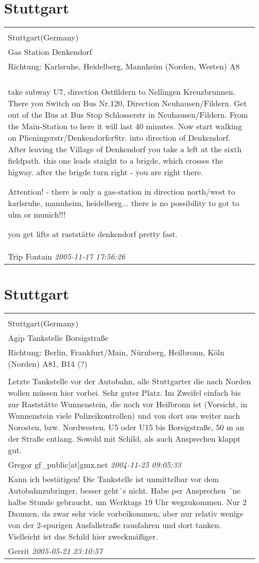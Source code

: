 \documentclass[a4paper,12pt]{article}
\begin{document}
\section{Stuttgart}
\begin{tabular}{|p{13cm}|}
\hline\\
Stuttgart(Germany)\\
Gas Station Denkendorf\\
Richtung: Karlsruhe, Heidelberg, Mannheim (Norden, Westen) A8 \\
\hline\\
take subway U7, direction Ostfildern to Nellingen Kreuzbrunnen. There you Switch on Bus Nr.120, Direction Neuhausen/Fildern. Get out of the Bus at Bus Stop Schlosserstr in Neuhausen/Fildern. From the Main-Station to here it will last 40 minutes. Now start walking on Plieningerstr/DenkendorferStr. into direction of Denkendorf. After leaving the Village of Denkendorf you take a left at the sixth fieldpath. this one leads staight to a brigde, which crosses the higway. after the brigde turn right - you are right there.

Attention! - there is only a gas-station in direction north/west to karlsruhe, mannheim, heidelberg... there is no possibility to got to ulm or munich!!!

you get lifts at raststätte denkendorf pretty fast. \\
Trip Fontain \textit{ 2005-11-17 17:56:26 }\\\hline
\end{tabular}


\section{Stuttgart}
\begin{tabular}{|p{13cm}|}
\hline\\
Stuttgart(Germany)\\
Agip Tankstelle Borsigstraße\\
Richtung: Berlin, Frankfurt/Main, Nürnberg, Heilbronn, Köln (Norden) A81, B14 (?) \\
\hline\\
Letzte Tankstelle vor der Autobahn, alle Stuttgarter die nach Norden wollen müssen hier vorbei. Sehr guter Platz. Im Zweifel einfach bis zur Raststätte Wunnenstein, die noch vor Heilbronn ist (Vorsicht, in Wunnenstein viele Polizeikontrollen) und von dort aus weiter nach Norosten, bzw. Nordwesten.
U5 oder U15 bis Borsigstraße, 50 m an der Straße entlang.
Sowohl mit Schild, als auch Ansprechen klappt gut. \\
Gregor gf\_public[at]gmx.net \textit{ 2004-11-25 09:05:33 }\\\hline Kann ich bestätigen! Die Tankstelle ist unmittelbar vor dem Autobahnzubringer, besser geht´s nicht. Habe per Ansprechen ´ne halbe Stunde gebraucht, um Werktags 19 Uhr wegzukommen. Nur 2 Daumen, da zwar sehr viele vorbeikommen, aber nur relativ wenige von der 2-spurigen Ausfallstraße rausfahren und dort tanken. Vielleicht ist das Schild hier zweckmäßiger. \\
Gerrit \textit{ 2005-05-21 23:10:57 }\\\hline
\end{tabular}
\end{document}
